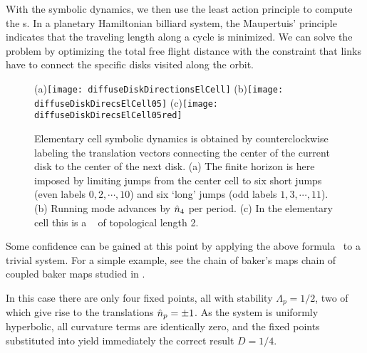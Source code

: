 With the symbolic dynamics, we then use the least action principle to
compute the \po s. In a planetary Hamiltonian
billiard system, the Maupertuis' principle indicates that the
traveling length along a cycle is minimized. We can solve the problem
by optimizing the total free flight distance with the constraint that
links have to connect the specific disks visited along the orbit.

\begin{figure}
  \begin{center}
    (a)\texttt{[image: diffuseDiskDirectionsElCell]}
    (b)\texttt{[image: diffuseDiskDirecsElCell05]}
    (c)\texttt{[image: diffuseDiskDirecsElCell05red]}
  \end{center}
  \caption{\label{fig-diskDirectionsElCell}
  Elementary cell symbolic dynamics is obtained by counterclockwise
  labeling the translation vectors connecting the center of the current
  disk to the center of  the next disk. (a) The finite horizon is here
  imposed by limiting jumps from  the center cell to six short jumps
  (even labels $0, 2,\cdots,10$) and six `long' jumps (odd labels $1,
  3,\cdots,11$). (b) Running mode   advances by $\hat{n}_4$ per
  period. (c) In the elementary cell this is  a \po\  of
  topological length 2.
  }
\end{figure}

Some confidence can be gained at this point by applying the above
formula~ to a trivial system. For a simple example,
see the chain of baker's maps chain of coupled baker maps studied in
.

In this case there are only four fixed points, all with stability
$\Lambda_p=1/2$, two of which give rise to the translations
$\hat{n}_{p}=\pm 1$. As the system is uniformly hyperbolic, all curvature
terms are identically zero, and the fixed points substituted into
 yield immediately the correct result $D=1/4$.
